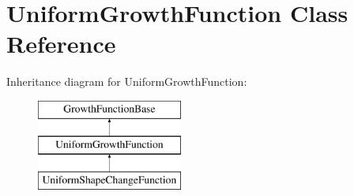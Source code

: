 \hypertarget{classUniformGrowthFunction}{}\section{Uniform\+Growth\+Function Class Reference}
\label{classUniformGrowthFunction}
Inheritance diagram for Uniform\+Growth\+Function\+:\begin{figure}[H]
\begin{center}
\leavevmode
\includegraphics[height=3.000000cm]{classUniformGrowthFunction}
\end{center}
\end{figure}
